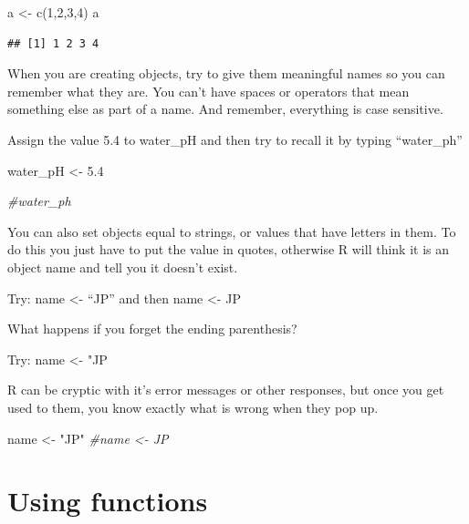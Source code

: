 \documentclass[
]{book}
\newenvironment{Shaded}{\begin{snugshade}}{\end{snugshade}}
\newcommand{\CommentTok}[1]{\textcolor[rgb]{0.56,0.35,0.01}{\textit{#1}}}
\newcommand{\DecValTok}[1]{\textcolor[rgb]{0.00,0.00,0.81}{#1}}
\newcommand{\FloatTok}[1]{\textcolor[rgb]{0.00,0.00,0.81}{#1}}
\newcommand{\FunctionTok}[1]{\textcolor[rgb]{0.00,0.00,0.00}{#1}}
\newcommand{\NormalTok}[1]{#1}
\newcommand{\OtherTok}[1]{\textcolor[rgb]{0.56,0.35,0.01}{#1}}
\newcommand{\StringTok}[1]{\textcolor[rgb]{0.31,0.60,0.02}{#1}}
\begin{document}
\begin{Shaded}
\begin{Highlighting}[]
\NormalTok{a }\OtherTok{\textless{}{-}} \FunctionTok{c}\NormalTok{(}\DecValTok{1}\NormalTok{,}\DecValTok{2}\NormalTok{,}\DecValTok{3}\NormalTok{,}\DecValTok{4}\NormalTok{)}
\NormalTok{a}
\end{Highlighting}
\end{Shaded}

\begin{verbatim}
## [1] 1 2 3 4
\end{verbatim}

When you are creating objects, try to give them meaningful names so you can remember what they are. You can't have spaces or operators that mean something else as part of a name. And remember, everything is case sensitive.

Assign the value 5.4 to water\_pH and then try to recall it by typing ``water\_ph''

\begin{Shaded}
\begin{Highlighting}[]
\NormalTok{water\_pH }\OtherTok{\textless{}{-}} \FloatTok{5.4}

\CommentTok{\#water\_ph}
\end{Highlighting}
\end{Shaded}

You can also set objects equal to strings, or values that have letters in them. To do this you just have to put the value in quotes, otherwise R will think it is an object name and tell you it doesn't exist.

Try: name \textless- ``JP'' and then name \textless- JP

What happens if you forget the ending parenthesis?

Try: name \textless- "JP

R can be cryptic with it's error messages or other responses, but once you get used to them, you know exactly what is wrong when they pop up.

\begin{Shaded}
\begin{Highlighting}[]
\NormalTok{name }\OtherTok{\textless{}{-}} \StringTok{"JP"}
\CommentTok{\#name \textless{}{-} JP}
\end{Highlighting}
\end{Shaded}

\hypertarget{using-functions}{%
\section{Using functions}\label{using-functions}}
\end{document}
